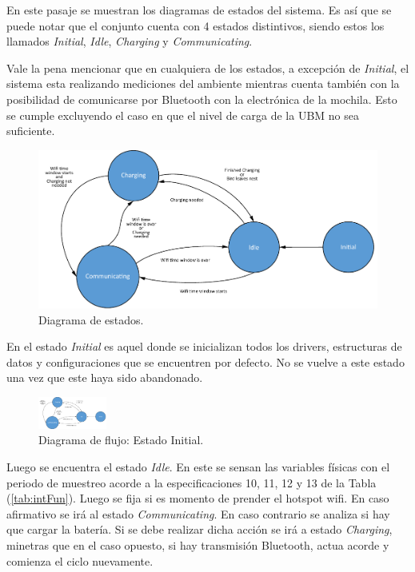En este pasaje se muestran los diagramas de estados del sistema. Es así que se puede notar que el conjunto cuenta con 4 estados distintivos, siendo estos los llamados \textit{Initial}, \textit{Idle}, \textit{Charging} y \textit{Communicating}.

Vale la pena mencionar que en cualquiera de los estados, a excepción de \textit{Initial}, el sistema esta realizando mediciones del ambiente mientras cuenta también con la posibilidad de comunicarse por Bluetooth con la electrónica de la mochila. Esto se cumple excluyendo el caso en que el nivel de carga de la UBM no sea suficiente.

\begin{figure}[H]
	\centering
	\includegraphics[width=\textwidth, page=1]{ImagenesIngenieria de Detalle/FlowChart.pdf}	
	\caption{Diagrama de estados.}
	\label{fig:Diagrama_de_Estados}
\end{figure}

En el estado \textit{Initial} es aquel donde se inicializan todos los drivers, estructuras de datos y configuraciones que se encuentren por defecto. No se vuelve a este estado una vez que este haya sido abandonado. 

\begin{figure}[H]
	\centering
	\includegraphics[width=0.2\textwidth, page=5]{ImagenesIngenieria de Detalle/FlowChart.pdf}	
	\caption{Diagrama de flujo: Estado Initial.}
	\label{fig:Diagrama_de_flujo_init}
\end{figure}

Luego se encuentra el estado \textit{Idle}. En este se sensan las variables físicas con el periodo de muestreo acorde a la especificaciones 10, 11, 12 y 13 de la Tabla (\ref{tab:intFun}). Luego se fija si es momento de prender el hotspot wifi. En caso afirmativo se irá al estado \textit{Communicating}. En caso contrario se analiza si hay que cargar la batería. Si se debe realizar dicha acción se irá a estado \textit{Charging}, minetras que en el caso opuesto, si hay transmisión Bluetooth, actua acorde y comienza el ciclo nuevamente.

